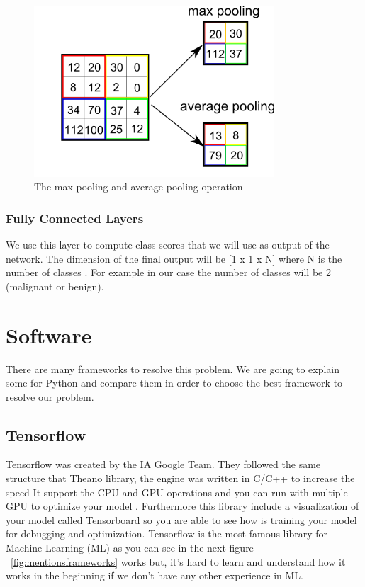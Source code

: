 \begin{figure}[H]
\centering
\includegraphics[width=0.8\textwidth]{./figures/pooling}
\caption{The max-pooling and average-pooling operation \cite{pooling}}
\label{fig:pooling}
\end{figure}

\subsubsection[Fully Connected Layers]{Fully Connected Layers}
We use this layer to compute class scores that we will use as output of the network. The dimension of the final output will be [1 x 1 x N] where N is the number of classes \cite{starteddeeplearning}. For example in our case the number of classes will be 2 (malignant or benign).




\section{Software}
There are many frameworks to resolve this problem. We are going to explain some for Python and compare them in order to choose the best framework to resolve our problem. 

\subsection[Tensorflow]{Tensorflow}
Tensorflow was created by the IA Google Team. They followed the same structure that Theano library, the engine was written in C/C++ to increase the speed \cite{generalcomparaison}
It support the CPU and GPU operations and you can run with multiple  GPU to optimize your model \cite{tensorflow}. Furthermore this library include a visualization of your model called Tensorboard so you are able to see how is training your model for debugging and optimization. Tensorflow is the most famous library for Machine Learning (ML) as you can see in the next figure ~\ref{fig:mentionsframeworks} works but, it's hard to learn and understand how it works in the beginning if we don't have any other experience in ML.


